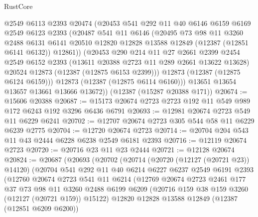 \begin{lexlean}{RustCore}
\begin{coremodule}
          @2549
          @6113
          @2393
          @20474
          (@20453
            @541
            @292
            @11
            @40
            @6146
            @6159
            @6169
            @2549
            @6123
            @2393
            (@20487
              @541
              @11
              @6146
              (@20495
                @73
                @98
                @11
                @3260
                @2488
                @6131
                @6141
                @20510
                @12820
                @12828
                @13588
                @12849
                (@12387 (@12851 @6141 @6132))
                @12861))
            (@20453
              @290
              @214
              @11
              @27
              @2661
              @2399
              @2454
              @2549
              @6152
              @2393
              (@13611 @20388 @2723 @11 @289 @2661 @13622 @13628)
              @20524
              @12873
              (@12387 (@12875 @6153 @2399)))
            @12873
            (@12387 (@12875 @6124 @6159)))
          @12873
          (@12387 (@12875 @6114 @6160)))
        @13651
        @13654
        @13657
        @13661
        @13666
        @13672))
    (@12387 (@15287 @20388 @171))
@20674 := @15606 @20388
@20687 := @15173 @20674 @2723 @2723 @192 @11 @549 @989 @172 @6243 @192 @3296 @6436 @6791
@20693 := @12981 @20674 @2723 @549 @11 @6229 @6241
@20702 := @12707 @20674 @2723 @305 @544 @58 @11 @6229 @6239 @2775
@20704 := @12720 @20674 @2723
@20714 := @20704 @204 @543 @11 @43 @2444 @6228 @6238 @2549 @6181 @2393
@20716 := @12119 @20674 @2723
@20720 := @20716 @23 @11 @23 @2444
@20721 := @12128 @20674
@20824 := @20687
    (@20693
      (@20702
        (@20714
          (@20720 (@12127 (@20721 @23)) @14120)
          (@20704
            @541
            @292
            @11
            @40
            @6214
            @6227
            @6237
            @2549
            @6191
            @2393
            (@12760
              @20674
              @2723
              @541
              @11
              @6214
              (@12769
                @20674
                @2723
                @2461
                @177
                @37
                @73
                @98
                @11
                @3260
                @2488
                @6199
                @6209
                (@20716 @159 @38 @159 @3260 (@12127 (@20721 @159)) @15122)
                @12820
                @12828
                @13588
                @12849
                (@12387 (@12851 @6209 @6200))

\end{coremodule}
\end{lexlean}

